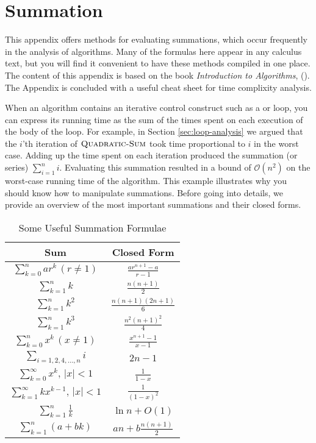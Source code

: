 \chapter{Summation}\label{app:appendix01}

This appendix offers methods for evaluating summations, which occur frequently in the analysis of algorithms. Many
of the formulas here appear in any calculus text, but you will find it convenient to have these methods compiled in one place. The content of this appendix is based on the book \textit{Introduction to Algorithms}, (\cite{clrs4}). The Appendix is concluded with a useful cheat sheet for time complixity analysis.

When an algorithm contains an iterative control construct such as a \While or \For loop, you can express its running time as the sum of the times spent on each execution of the body of the loop. For example, in Section \ref{sec:loop-analysis} we argued that the $i$'th iteration of $\proc{Quadratic-Sum}$ took time proportional to $i$ in the worst case. Adding up the time spent on each iteration produced the summation (or series) $\sum\limits_{i=1}^n i$. Evaluating this summation resulted in a bound of $\mathcal{O}(n^2)$ on the worst-case running time of the algorithm. This example illustrates why you should know how to manipulate summations. Before going into details, we provide an overview of the most important summations and their closed forms.

\begin{table}[h!]
    \centering
    \renewcommand{\arraystretch}{2}
    \begin{tabular}{|c|c|}
    \hline
    \textbf{Sum} & \textbf{Closed Form} \\ \hline
    $\displaystyle \sum_{k=0}^n ar^k \, (r \neq 1)$ & $\displaystyle \frac{ar^{n+1} - a}{r - 1}$ \\ \hline
    $\displaystyle \sum_{k=1}^n k$ & $\displaystyle \frac{n(n+1)}{2}$ \\ \hline
    $\displaystyle \sum_{k=1}^n k^2$ & $\displaystyle \frac{n(n+1)(2n+1)}{6}$ \\ \hline
    $\displaystyle \sum_{k=1}^n k^3$ & $\displaystyle \frac{n^2(n+1)^2}{4}$ \\ \hline
    $\displaystyle \sum_{k=0}^n x^k \, (x \neq 1)$ & $\displaystyle \frac{x^{n+1} - 1}{x - 1}$ \\ \hline
    $\displaystyle \sum_{i=1,2,4,\ldots,n} i$ & $\displaystyle 2n - 1$ \\ \hline
    $\displaystyle \sum_{k=0}^\infty x^k, \, |x| < 1$ & $\displaystyle \frac{1}{1 - x}$ \\ \hline
    $\displaystyle \sum_{k=1}^\infty kx^{k-1}, \, |x| < 1$ & $\displaystyle \frac{1}{(1 - x)^2}$ \\ \hline
    $\displaystyle \sum_{k=1}^n \frac{1}{k}$ & $\displaystyle \ln n + O(1)$ \\ \hline
    $\displaystyle \sum_{k=1}^n (a + bk)$ & $\displaystyle a n + b \frac{n(n+1)}{2}$ \\ \hline  
    \end{tabular}
    \caption{Some Useful Summation Formulae}
\end{table}


